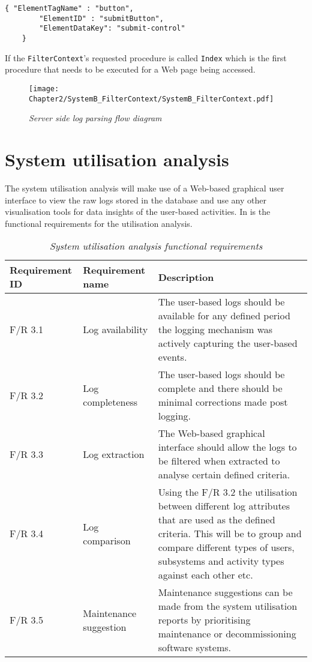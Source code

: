 \begin{lstlisting}[style=json, caption={\textit{Element properties JSON}}, label={fig:Ch2_ElementInfo}] 
	{ "ElementTagName" : "button",
		"ElementID" : "submitButton",
		"ElementDataKey": "submit-control"		
	}
\end{lstlisting}

If the \texttt{FilterContext}'s requested procedure is called \texttt{Index} which is the first procedure that needs to be executed for a Web page being accessed.

\begin{figure}[!htb]
	\centering
	\texttt{[image: Chapter2/SystemB\_FilterContext/SystemB\_FilterContext.pdf]}
	\caption[Server side log parsing flow diagram]
	{\textit{Server side log parsing flow diagram}}\label{fig:ch2_loggingParse}
\end{figure}

\clearpage

\section{System utilisation analysis}\label{ch2:sec_system_utilisation_analysis}
The system utilisation analysis will make use of a Web-based graphical user interface to view the raw logs stored in the database and use any other visualisation tools for data insights of the user-based activities. In  is the functional requirements for the utilisation analysis.

\begin{table}[!htb]
	\centering
	\caption[System utilisation analysis functional requirements]
	{\textit{System utilisation analysis functional requirements}}
	\label{tbl:ch2_utilisation_requirements}
	\begin{tabularx}{\textwidth}{|l|l|X|}
		\hline \textbf{Requirement ID} & \textbf{Requirement name} & \textbf{Description} \\
		\hline F/R 3.1 & Log availability & \RaggedRight The user-based logs should be available for any defined period the logging mechanism was actively capturing the user-based events. \\
		\hline F/R 3.2 & Log completeness & \RaggedRight The user-based logs should be complete and there should be minimal corrections made post logging. \\
		\hline F/R 3.3 & Log extraction & \RaggedRight The Web-based graphical interface should allow the logs to be filtered when extracted to analyse certain defined criteria. \\
		\hline F/R 3.4 & Log comparison & \RaggedRight Using the F/R 3.2 the utilisation between different log attributes that are used as the defined criteria. This will be to group and compare different types of users, subsystems and activity types against each other etc.\\
		\hline F/R 3.5 & \RaggedRight Maintenance suggestion & Maintenance suggestions can be made from the system utilisation reports by prioritising maintenance or decommissioning software systems. \\
		\hline
	\end{tabularx}
\end{table}

